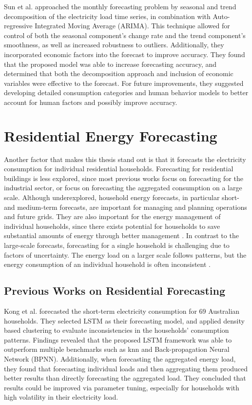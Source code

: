 Sun et al. \cite{sun_monthly_2019} approached the monthly forecasting problem by seasonal and trend decomposition of the electricity load time series, in combination with Auto-regressive Integrated Moving Average (ARIMA). This technique allowed for control of both the seasonal component's change rate and the trend component's smoothness, as well as increased robustness to outliers. Additionally, they incorporated economic factors into the forecast to improve accuracy. They found that the proposed model was able to increase forecasting accuracy, and determined that both the decomposition approach and inclusion of economic variables were effective to the forecast. For future improvements, they suggested developing detailed consumption categories and human behavior models to better account for human factors and possibly improve accuracy.

\section{Residential Energy Forecasting}

Another factor that makes this thesis stand out is that it forecasts the electricity consumption for individual residential households. Forecasting for residential buildings is less explored, since most previous works focus on forecasting for the industrial sector, or focus on forecasting the aggregated consumption on a large scale. Although underexplored, household energy forecasts, in particular short- and medium-term forecasts, are important for managing and planning operations and future grids. They are also important for the energy management of individual households, since there exists potential for households to save substantial amounts of energy through better management \cite{zhou_understanding_2016,kong_short-term_2019,nti_electricity_2020}. In contrast to the large-scale forecasts, forecasting for a single household is challenging due to factors of uncertainty. The energy load on a larger scale follows patterns, but the energy consumption of an individual household is often inconsistent \cite{kong_short-term_2019}.

\subsection{Previous Works on Residential Forecasting}

Kong et al. \cite{kong_short-term_2019} forecasted the short-term electricity consumption for 69 Australian households. They selected LSTM as their forecasting model, and applied density based clustering to evaluate inconsistencies in the households' consumption patterns. Findings revealed that the proposed LSTM framework was able to outperform multiple benchmarks such as \ac{knn} and Back-propagation Neural Network (BPNN). Additionally, when forecasting the aggregated energy load, they found that forecasting individual loads and then aggregating them produced better results than directly forecasting the aggregated load. They concluded that results could be improved via parameter tuning, especially for households with high volatility in their electricity load.

